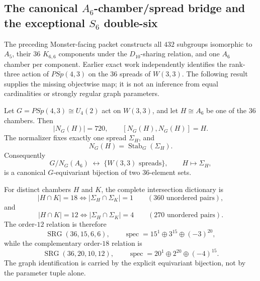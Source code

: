 \makeatletter
{}
\makeatother
\subsection{The canonical $A_6$-chamber/spread bridge and the exceptional $S_6$ double-six}
\label{sec:monster-a6-spread-bridge}

The preceding Monster-facing packet constructs all $432$ subgroups isomorphic to
$A_5$, their $36$ $K_{6,6}$ components under the $D_{10}$-sharing relation, and
one $A_6$ chamber per component.  Earlier exact work independently identifies the
rank-three action of $PSp(4,3)$ on the $36$ spreads of $W(3,3)$.  The following
result supplies the missing objectwise map; it is not an inference from equal
cardinalities or strongly regular graph parameters.

\begin{theorem}
Let $G=PSp(4,3)\cong U_4(2)$ act on $W(3,3)$, and let $H\cong A_6$ be one of the
$36$ chambers.  Then
\[
 |N_G(H)|=720,
 \qquad
 [N_G(H),N_G(H)]=H.
\]
The normalizer fixes exactly one spread $\Sigma_H$, and
\[
 N_G(H)=\operatorname{Stab}_G(\Sigma_H).
\]
Consequently
\[
 \boxed{
 G/N_G(A_6)\;\longleftrightarrow\;
 \{\text{$W(3,3)$ spreads}\},
 \qquad H\longmapsto\Sigma_H,
 }
\]
is a canonical $G$-equivariant bijection of two $36$-element sets.
\end{theorem}

For distinct chambers $H$ and $K$, the complete intersection dictionary is
\[
 \boxed{|H\cap K|=18\iff|\Sigma_H\cap\Sigma_K|=1}
 \qquad(360\text{ unordered pairs}),
\]
and
\[
 \boxed{|H\cap K|=12\iff|\Sigma_H\cap\Sigma_K|=4}
 \qquad(270\text{ unordered pairs}).
\]
The order-$12$ relation is therefore
\[
 \operatorname{SRG}(36,15,6,6),
 \qquad
 \operatorname{spec}=15^1\oplus3^{15}\oplus(-3)^{20},
\]
while the complementary order-$18$ relation is
\[
 \operatorname{SRG}(36,20,10,12),
 \qquad
 \operatorname{spec}=20^1\oplus2^{20}\oplus(-4)^{15}.
\]
The graph identification is carried by the explicit equivariant bijection, not
by the parameter tuple alone.

